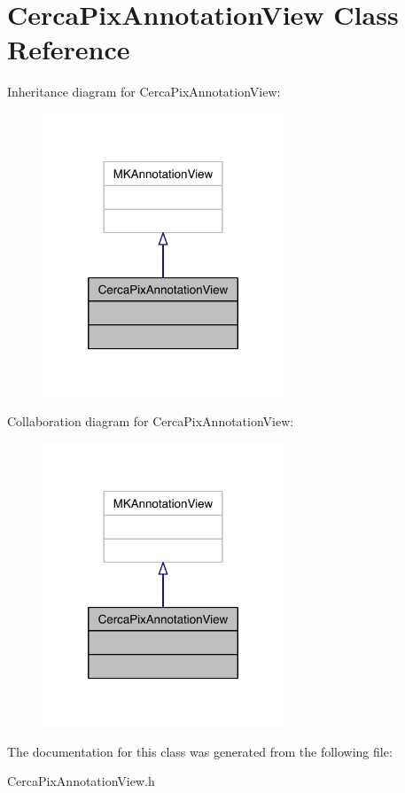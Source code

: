 \hypertarget{interface_cerca_pix_annotation_view}{\section{Cerca\-Pix\-Annotation\-View Class Reference}
\label{interface_cerca_pix_annotation_view}
}


Inheritance diagram for Cerca\-Pix\-Annotation\-View\-:\nopagebreak
\begin{figure}[H]
\begin{center}
\leavevmode
\includegraphics[width=204pt]{interface_cerca_pix_annotation_view__inherit__graph}
\end{center}
\end{figure}


Collaboration diagram for Cerca\-Pix\-Annotation\-View\-:\nopagebreak
\begin{figure}[H]
\begin{center}
\leavevmode
\includegraphics[width=204pt]{interface_cerca_pix_annotation_view__coll__graph}
\end{center}
\end{figure}


The documentation for this class was generated from the following file\-:\begin{DoxyCompactItemize}
\item 
Cerca\-Pix\-Annotation\-View.\-h\end{DoxyCompactItemize}
